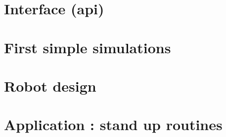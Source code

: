 \section{Interface (api)}

\section{First simple simulations}

\section{Robot design}

\section{Application : stand up routines}
\cite{standing_up_routines}
